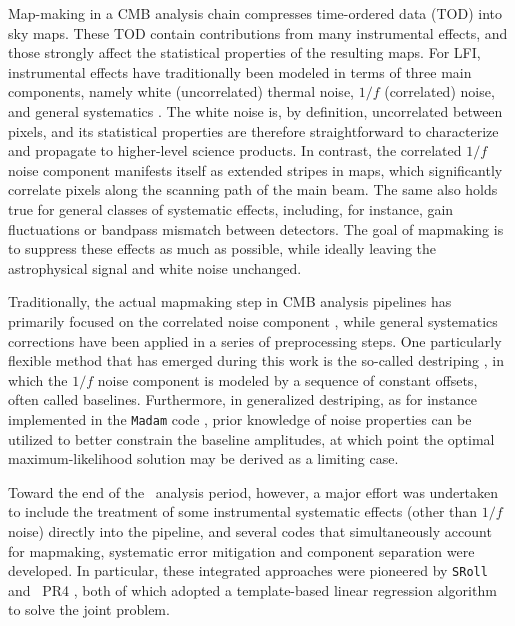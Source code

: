 \documentclass[twocolumn]{aa}
\newcommand{\sroll}[0]{\texttt{SRoll}}
\begin{document}
Map-making in a CMB analysis chain compresses time-ordered data (TOD)
into sky maps. These TOD contain contributions from many instrumental
effects, and those strongly affect the statistical properties of the
resulting maps. For LFI, instrumental effects have traditionally
been modeled in terms of three main components, namely white
(uncorrelated) thermal noise, $1/f$ (correlated) noise, and general
systematics \citep{Mennella_2010, Zacchei_2011}. The white noise is, by
definition, uncorrelated between pixels, and its statistical properties
are therefore straightforward to characterize and propagate to
higher-level science products. In contrast, the correlated $1/f$ noise
component manifests itself as extended stripes in maps, which
significantly correlate pixels along the scanning path of the
main beam. The same also holds true for general classes of systematic
effects, including, for instance, gain fluctuations or bandpass mismatch
between detectors. The goal of mapmaking is to suppress these effects
as much as possible, while ideally leaving the astrophysical signal
and white noise unchanged.

Traditionally, the actual mapmaking step in CMB analysis pipelines
has primarily focused on the correlated noise component
\citep[e.g.,][and references therein]{tegmark1997,ashdown:2007}, while
general systematics corrections have been applied in a series of
preprocessing steps. One particularly flexible method that has
emerged during this work is the so-called destriping
\citep{1998A&AS..127..555D,1999astro.ph..6360B,1999A&AS..140..383M,2002A&A...387..356M,2004A&A...428..287K,2005MNRAS.360..390K,2009A&A...506.1511K,2010A&A...510A..57K},
in which the $1/f$ noise component is modeled by a sequence of
constant offsets, often called baselines. Furthermore, in generalized
destriping, as for instance implemented in the {\tt Madam} code
\citep{2005MNRAS.360..390K,2010A&A...510A..57K}, prior knowledge of
noise properties can be utilized to better constrain the baseline
amplitudes, at which point the optimal maximum-likelihood solution may
be derived as a limiting case.

Toward the end of the \Planck\ analysis period, however, a major effort was undertaken
to include the treatment of some instrumental systematic effects
(other than $1/f$ noise) directly into the pipeline, and several codes 
that simultaneously account for mapmaking,
systematic error mitigation and component separation were
developed. In particular, these integrated approaches were pioneered
by \sroll\ \citep{planck2016-l03} and \Planck\ PR4 \citep{npipe}, both of
which adopted a template-based linear regression algorithm to solve
the joint problem.
\end{document}
